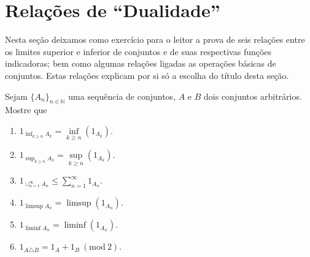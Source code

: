 \section{Relações de ``Dualidade''}

Nesta seção deixamos como exercício para o leitor a prova de
seis relações entre os limites superior e inferior de conjuntos 
e de suas respectivas funções indicadoras; 
bem como algumas relações ligadas as operações
básicas de conjuntos. Estas relações explicam por si só a escolha 
do título desta seção. 

\begin{exercicio}
Sejam $\{A_n\}_{n\in\mathbb{N}}$ uma sequência de 
conjuntos, $A$ e $B$ dois conjuntos arbitrários. Mostre que 
\begin{enumerate}
\item 
$
1_{\inf_{k\geqslant n} A_k} 
= 
\inf \limits_{k\geqslant n} (1_{A_k})
$.

\item
$
1_{\sup_{k\geqslant n} A_k} 
= 
\sup \limits_{k\geqslant n} (1_{A_k})
$.

\item
$
1_{\cup_{n=1}^{\infty} A_n} 
\leqslant 
\sum \limits_{n=1}^{\infty} 1_{A_n}
$.

\item
$
1_{\limsup A_n} 
= 
\limsup (1_{A_n})
$.

\item
$
1_{\liminf A_n} 
= 
\liminf (1_{A_n})
$.

\item
$ 
1_{A \triangle B} 
= 
1_A + 1_B \ (\mathrm{mod}\ 2)
$.
\end{enumerate}
\end{exercicio}

